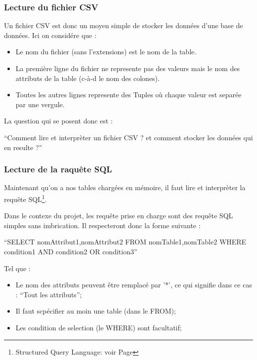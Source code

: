 \documentclass[oneside,13pt,a4paper]{report}
\begin{document}
\subsubsection{Lecture du fichier CSV}

Un fichier CSV est donc un moyen simple de stocker les données d'une base de données.
Ici on considére que :
\begin{itemize}
	\item Le nom du fichier (sans l'extensions) est le nom de la table.
	\item La première ligne du fichier ne represente pas des valeurs mais le nom des attributs de la table (c-à-d le nom des colones).
	\item Toutes les autres lignes represente des Tuples où chaque valeur est separée par une vergule.
\end{itemize}
\vspace{0.3cm}

La question qui se posent donc est :
\begin{center}
	\enquote{Comment lire et interprèter un fichier CSV ? et comment stocker les données qui en resulte ?}
\end{center}

\subsubsection{Lecture de la raquête SQL}

Maintenant qu'on a nos tables chargées en mémoire, il faut lire et interprèter la requête SQL\footnote{Structured Query Language: voir Page \pageref{sql}}.

Dans le contexe du projet, les requête prise en charge sont des requête SQL simples sans imbrication. Il respecteront donc la forme suivante : 

\enquote{SELECT nomAttribut1,nomAttribut2 FROM nomTable1,nomTable2 WHERE condition1 AND condition2 OR condition3}

Tel que : 
\begin{itemize}
	\item Le nom des attributs peuvent être remplacé par '*', ce qui signifie dans ce cas : \enquote{Tout les attributs};
	\item Il faut scpécifier au moin une table (dans le FROM);
	\item Les condition de selection (le WHERE) sont facultatif;
\end{itemize}
\vspace{0.3cm}
\end{document}
